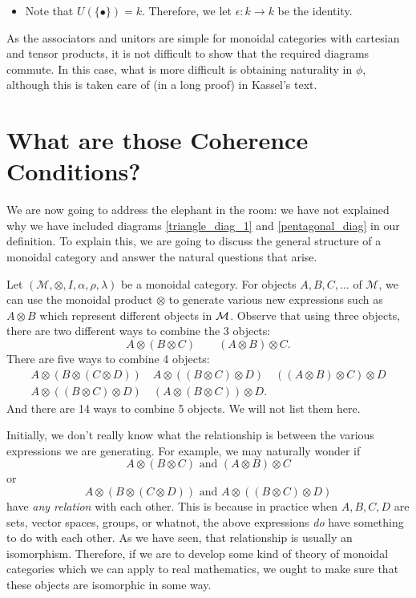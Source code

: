 \begin{example}
\begin{itemize}
        \item Note that $U(\{\bullet\}) = k$. Therefore, we let 
        $\epsilon: k \to k$ be the identity. 
    \end{itemize}
    As the associators and unitors are simple for monoidal categories with cartesian 
    and tensor products, it is not difficult to show that the required diagrams commute. 
    In this case, what is more difficult is obtaining naturality in $\phi$, although this is 
    taken care of (in a long proof) in Kassel's text. 
\end{example}


\newpage 
\section{What are those Coherence Conditions?}
We are now going to address the elephant in the room: we have not explained why 
we have included diagrams \ref{triangle_diag_1} and \ref{pentagonal_diag} in our definition. 
To explain this, we are going to discuss the general structure of a monoidal category 
and answer the natural questions that arise. 

Let $(\mathcal{M}, \otimes, I, \alpha, \rho, \lambda)$ be a monoidal category. 
For objects $A,B,C, \dots$ of $\mathcal{M}$, we can use the monoidal
product $\otimes$ to generate various new expressions
such as $A\otimes B$ which represent different objects in $\mathcal{M}$.
Observe that using three objects, there are two different 
ways to combine the 3 objects:
\[
    A\otimes (B \otimes C)
    \qquad 
    (A\otimes B) \otimes C.
\]
There are five ways to combine 4 objects:
\begin{gather*}
    A\otimes(B\otimes (C \otimes D))
    \quad 
    A\otimes((B\otimes C) \otimes D)
    \quad 
    ((A\otimes B)\otimes C) \otimes D
    \\
    A\otimes((B \otimes C) \otimes D)
    \quad 
    (A \otimes (B \otimes C))\otimes D.
\end{gather*}
And there are 14 ways to combine 5 objects. We will not list them here.  

Initially, we don't really know what the relationship 
is between the various expressions we are generating. For example, we may 
naturally wonder if
\[
    A \otimes(B \otimes C) \text{ and } (A \otimes B)\otimes C
\]
or
\[
    A\otimes(B\otimes (C \otimes D))  \text{ and }A\otimes((B \otimes C) \otimes D)
\]
have \emph{any relation} with each other. This is because 
in practice when $A,B,C,D$ are sets, vector spaces, groups, or whatnot, the above expressions 
\emph{do} have something to do with each other. As we have seen, 
that relationship is usually an isomorphism. Therefore, if we are to develop some kind of 
theory of monoidal categories which we can apply to real mathematics, 
we ought to make sure that these objects are isomorphic in some way. 
 
